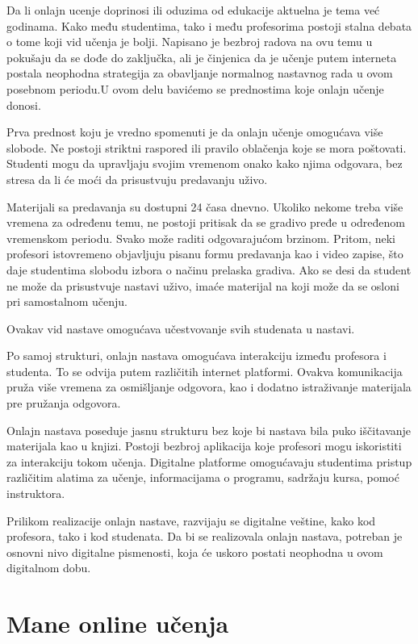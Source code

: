 \documentclass{article}
\begin{document}
Da li onlajn ucenje doprinosi ili oduzima od edukacije aktuelna je tema već godinama. Kako među studentima, tako i među profesorima postoji stalna debata o tome koji vid učenja je bolji. Napisano je bezbroj radova na ovu temu u pokušaju da se dođe do zaključka, ali je činjenica da je učenje putem interneta postala neophodna strategija za obavljanje normalnog nastavnog rada u ovom posebnom periodu.U ovom delu bavićemo se prednostima koje onlajn učenje donosi.

Prva prednost koju je vredno spomenuti je da onlajn učenje omogućava više slobode. Ne postoji striktni raspored ili pravilo oblačenja koje se mora poštovati. Studenti mogu da upravljaju svojim vremenom onako kako njima odgovara, bez stresa da li će moći da prisustvuju predavanju uživo.

Materijali sa predavanja su dostupni 24 časa dnevno. Ukoliko nekome treba više vremena za određenu temu, ne postoji pritisak da se gradivo pređe u određenom vremenskom periodu. Svako može raditi odgovarajućom brzinom. Pritom, neki profesori istovremeno objavljuju pisanu formu predavanja kao i video zapise, što daje studentima slobodu izbora o načinu prelaska gradiva. Ako se desi da student ne može da prisustvuje nastavi uživo, imaće materijal na koji može da se osloni pri samostalnom učenju.

Ovakav vid nastave omogućava učestvovanje svih studenata u nastavi.

Po samoj strukturi, onlajn nastava omogućava interakciju između profesora i studenta. To se odvija putem različitih internet platformi. Ovakva komunikacija pruža više vremena za osmišljanje odgovora, kao i dodatno istraživanje materijala pre pružanja odgovora.

Onlajn nastava poseduje jasnu strukturu bez koje bi nastava bila puko iščitavanje materijala kao u knjizi. Postoji bezbroj aplikacija koje profesori mogu iskoristiti za interakciju tokom učenja. Digitalne platforme omogućavaju studentima pristup različitim alatima za učenje, informacijama o programu, sadržaju kursa, pomoć instruktora.

Prilikom realizacije onlajn nastave, razvijaju se digitalne veštine, kako kod profesora, tako i kod studenata. Da bi se realizovala onlajn nastava, potreban je osnovni nivo digitalne pismenosti, koja će uskoro postati neophodna u ovom digitalnom dobu.


\section{Mane online učenja}
\end{document}
